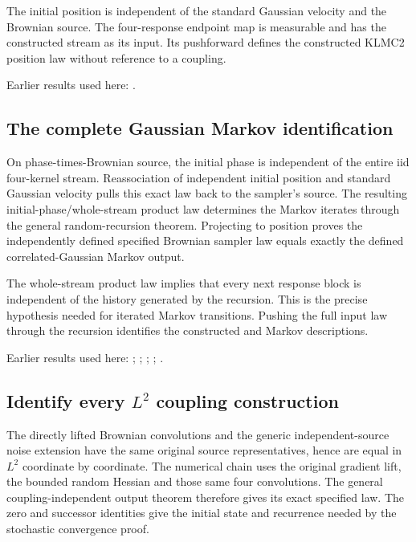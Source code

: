 \documentclass[11pt,a4paper]{report}
\begin{document}
The initial position is independent of the standard Gaussian velocity and the Brownian source. The four-response endpoint map is measurable and has the constructed stream as its input. Its pushforward defines the constructed KLMC2 position law without reference to a coupling.



Earlier results used here: \cite[Section~3.8.16]{LangevinLean2026ULASC}.
\subsection{\texorpdfstring{The complete Gaussian Markov identification}{The complete Gaussian Markov identification}}
\label{report-step-KineticLangevin-CanonicalKLMC2Law-lean-2}


On phase-times-Brownian source, the initial phase is independent of the entire iid four-kernel stream. Reassociation of independent initial position and standard Gaussian velocity pulls this exact law back to the sampler’s source. The resulting initial-phase/\allowbreak{}whole-stream product law determines the Markov iterates through the general random-recursion theorem. Projecting to position proves the independently defined specified Brownian sampler law equals exactly the defined correlated-Gaussian Markov output.



The whole-stream product law implies that every next response block is independent of the history generated by the recursion. This is the precise hypothesis needed for iterated Markov transitions. Pushing the full input law through the recursion identifies the constructed and Markov descriptions.



Earlier results used here: \cite[Section~3.17.1]{LangevinLean2026ULASC}; \cite[Section~3.20.1]{LangevinLean2026ULASC}; \cite[Section~3.20.4]{LangevinLean2026ULASC}; \cite[Section~3.33.6]{LangevinLean2026ULASC}; \cite[Section~3.8.17]{LangevinLean2026ULASC}.
\subsection{\texorpdfstring{Identify every \(L^{2}\) coupling construction}{Identify every L² coupling construction}}
\label{report-step-KineticLangevin-CanonicalKLMC2Law-lean-3}


The directly lifted Brownian convolutions and the generic independent-source noise extension have the same original source representatives, hence are equal in \(L^{2}\) coordinate by coordinate. The numerical chain uses the original gradient lift, the bounded random Hessian and those same four convolutions. The general coupling-independent output theorem therefore gives its exact specified law. The zero and successor identities give the initial state and recurrence needed by the stochastic convergence proof.
\end{document}
